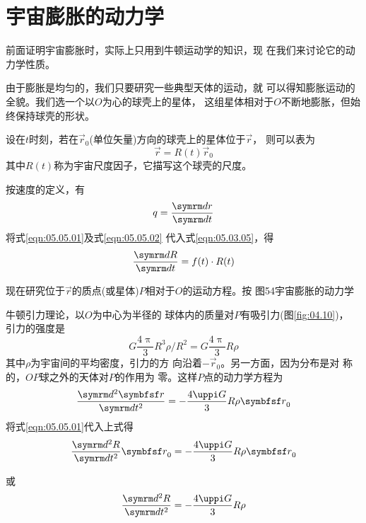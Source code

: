 \section{宇宙膨胀的动力学}\label{sec:05.05}

前面证明宇宙膨胀时，实际上只用到牛顿运动学的知识，现
在我们来讨论它的动力学性质。

由于膨胀是均匀的，我们只要研究一些典型天体的运动，就
可以得知膨胀运动的全貌。我们选一个以$ O $为心的球壳上的星体，
这组星体相对于$ O $不断地膨胀，但始终保持球壳的形状。

设在$ t $时刻，若在$ \vec{r}_0 $(单位矢量)方向的球壳上的星体位于$ \vec{r} $，
则可以表为
\begin{equation}\label{eqn:05.05.01}
 \vec{r} = R ( t ) \vec{r} _ { 0 }
\end{equation}
其中$ R(t) $称为宇宙尺度因子，它描写这个球壳的尺度。

按速度的定义，有
\begin{equation}\label{eqn:05.05.02}
 q = \frac { \dif r } { \dif t }
\end{equation}
将式\eqref{eqn:05.05.01}及式\eqref{eqn:05.05.02} 代入式\eqref{eqn:05.03.05}，得
\begin{equation}\label{eqn:05.05.03}
 \frac { \dif R } { \dif t } = f ( t ) \cdot R ( t )
\end{equation}

现在研究位于$\vec{r}$的质点(或星体)$ P $相对于$ O $的运动方程。按
图54宇宙膨胀的动力学

牛顿引力理论，以$ O $为中心为半径的
球体内的质量对$ P $有吸引力(图\ref{fig:04.10})，
引力的强度是
\begin{equation*}
 G \frac { 4 \uppi } { 3 } R ^ { 3 } \rho / R ^ { 2 } = G \frac { 4 \uppi } { 3 } R \rho
\end{equation*}
其中$ \rho $为宇宙间的平均密度，引力的方
向沿着$ - \vec{r} _ 0 $。另一方面，因为分布是对
称的，$ OP $球之外的天体对$ P $的作用为
零。这样$ P $点的动力学方程为
\begin{equation*}
 \frac { \dif ^ { 2 } \vec{r} } { \dif t ^ { 2 } } = - \frac { 4 \uppi G } { 3 } R \rho \vec{ r } _ 0
\end{equation*}
将式\eqref{eqn:05.05.01}代入上式得
\begin{equation*}
 \frac { \dif ^ { 2 } R } { \dif t ^ { 2 } } \vec{r} _ { 0 } = - \frac { 4 \uppi G } { 3 } R \rho \vec{r} _ 0
\end{equation*}

\clearpage
\noindent 或 \vspace{-0.6em}
\begin{equation}\label{eqn:05.05.04}
 \frac { \dif ^ { 2 } R } { \dif t ^ { 2 } } = - \frac { 4 \uppi G } { 3 } R \rho
\end{equation}

